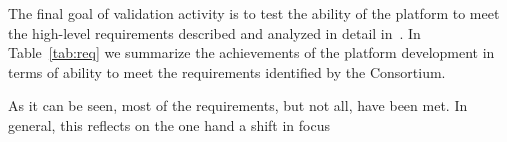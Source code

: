 

The final goal of validation activity is to test the ability of the platform to meet the high-level requirements %
described and analyzed in detail in~\cite{D8.1}. In Table~\ref{tab:req} we summarize the achievements of the platform development in terms of ability to meet the requirements identified by the Consortium.

As it can be seen, most of the requirements, but not all, have been met. In general, this reflects on the one hand a shift in focus  


